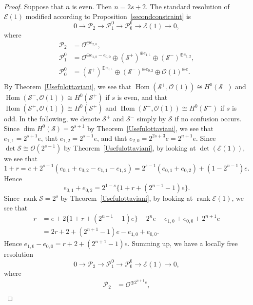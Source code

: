 \documentclass[a4paper,12pt]{amsart}
\DeclareMathOperator{\Hom}{Hom}
\DeclareMathOperator{\rk}{rank}
\begin{document}
\begin{proof}
Suppose that $n$ is even. Then $n=2s+2$.
The standard resolution of $\mathcal{E}(1)$
modified according to Proposition~\ref{secondconstraint}
is 
\[
0
\to \mathcal{P}_2
\to \mathcal{P}^{0}_1
\to \mathcal{P}^{0}_0
\to \mathcal{E}(1)
\to 0,
\]
where 
\begin{equation*}
\begin{split}
\mathcal{P}_2&=\mathcal{O}^{\oplus e_{2,0}},\\
\mathcal{P}^{0}_1&=\mathcal{O}^{\oplus e_{1,0}-e_{0,0}}\oplus (\mathcal{S}^+)^{\oplus e_{1,1}}\oplus(\mathcal{S}^-)^{\oplus e_{1,2}},\\
\mathcal{P}^{0}_0&=(\mathcal{S}^+)^{\oplus e_{0,1}}\oplus(\mathcal{S}^-)^{\oplus e_{0,2}}\oplus \mathcal{O}(1)^{\oplus e}.\\
\end{split}
\end{equation*}
By Theorem~\ref{Usefulottaviani},
we see that 
$\Hom(\mathcal{S^+},\mathcal{O}(1))\cong H^0(\mathcal{S^-})$ 
and $\Hom(\mathcal{S^-},\mathcal{O}(1))\cong H^0(\mathcal{S^+})$ 
if $s$ is 
even,
and that $\Hom(\mathcal{S^+},\mathcal{O}(1))\cong H^0(\mathcal{S^+})$
and $\Hom(\mathcal{S^-},\mathcal{O}(1))\cong H^0(\mathcal{S^-})$ if $s$ is 
odd.
In the following, we denote $\mathcal{S}^+$ and  $\mathcal{S}^-$ simply by $\mathcal{S}$ 
if no confusion occurs.
Since $\dim H^0(\mathcal{S})=2^{s+1}$ by Theorem~\ref{Usefulottaviani}, 
we see that $e_{1,1}=2^{s+1}e$,
that $e_{1,2}=2^{s+1}e$, and that $e_{2,0}=2^{2s+3}e=2^{n+1}e$.
Since $\det\mathcal{S}\cong \mathcal{O}(2^{s-1})$ by Theorem~\ref{Usefulottaviani}, by looking at $\det(\mathcal{E}(1))$,
we see that 
\[1+r=e+2^{s-1}(e_{0,1}+e_{0,2}-e_{1,1}-e_{1,2})=2^{s-1}(e_{0,1}+e_{0,2})+(1-2^{n-1})e.\]
Hence 
\[e_{0,1}+e_{0,2}=2^{1-s}\{1+r+(2^{n-1}-1)e\}.
\]
Since $\rk \mathcal{S}=2^s$ by Theorem~\ref{Usefulottaviani},
by looking at $\rk\mathcal{E}(1)$, we see that 
\begin{equation*}
\begin{split}
r&=e+2\{1+r+(2^{n-1}-1)e\}-2^{n}e
-e_{1,0}
+e_{0,0}+2^{n+1}e\\
&=
2r+2+(2^{n+1}-1)e-e_{1,0}+e_{0,0}.
\end{split}
\end{equation*}
Hence $e_{1,0}-e_{0,0}=r+2+(2^{n+1}-1)e$.
Summing up, we have a locally free resolution
\[
0
\to 
\mathcal{P}_2
\to 
\mathcal{P}^{0}_1
\to 
\mathcal{P}^{0}_0
\to \mathcal{E}(1)\to 0,
\]
where 
\begin{equation*}
\begin{split}
\mathcal{P}_2&=\mathcal{O}^{\oplus 2^{n+1}e},\\

\end{split}
\end{equation*}
\end{proof}
\end{document}
